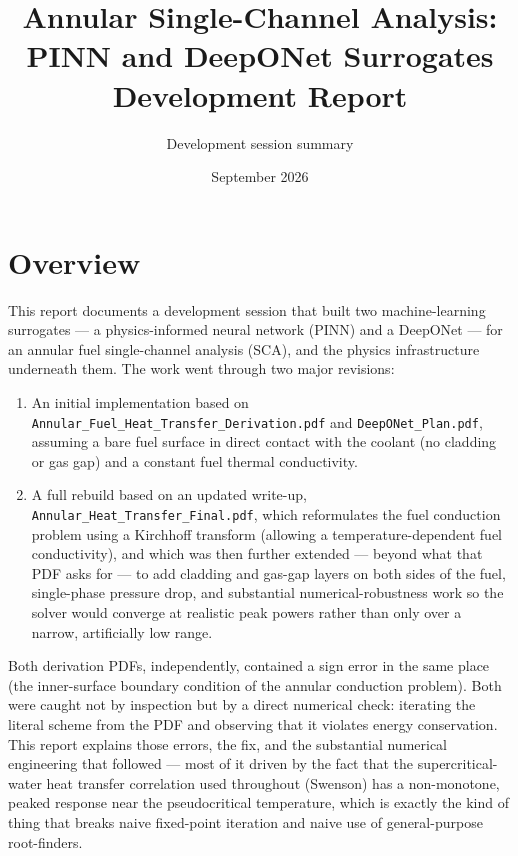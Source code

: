 \documentclass[11pt]{article}
\title{Annular Single-Channel Analysis: PINN and DeepONet Surrogates\\
\large Development Report}
\author{Development session summary}
\date{September 2026}
\begin{document}
\maketitle
\tableofcontents
\newpage

\section{Overview}

This report documents a development session that built two machine-learning
surrogates --- a physics-informed neural network (PINN) and a DeepONet ---
for an annular fuel single-channel analysis (SCA), and the physics
infrastructure underneath them. The work went through two major revisions:

\begin{enumerate}
\item An initial implementation based on
\texttt{Annular\_Fuel\_Heat\_Transfer\_Derivation.pdf} and
\texttt{DeepONet\_Plan.pdf}, assuming a bare fuel surface in direct contact
with the coolant (no cladding or gas gap) and a constant fuel thermal
conductivity.
\item A full rebuild based on an updated write-up,
\texttt{Annular\_Heat\_Transfer\_Final.pdf}, which reformulates the fuel
conduction problem using a Kirchhoff transform (allowing a
temperature-dependent fuel conductivity), and which was then further
extended --- beyond what that PDF asks for --- to add cladding and gas-gap
layers on both sides of the fuel, single-phase pressure drop, and
substantial numerical-robustness work so the solver would converge at
realistic peak powers rather than only over a narrow, artificially low
range.
\end{enumerate}

Both derivation PDFs, independently, contained a sign error in the same
place (the inner-surface boundary condition of the annular conduction
problem). Both were caught not by inspection but by a direct numerical
check: iterating the literal scheme from the PDF and observing that it
violates energy conservation. This report explains those errors, the fix,
and the substantial numerical engineering that followed --- most of it
driven by the fact that the supercritical-water heat transfer correlation
used throughout (Swenson) has a non-monotone, peaked response near the
pseudocritical temperature, which is exactly the kind of thing that breaks
naive fixed-point iteration and naive use of general-purpose root-finders.
\end{document}
